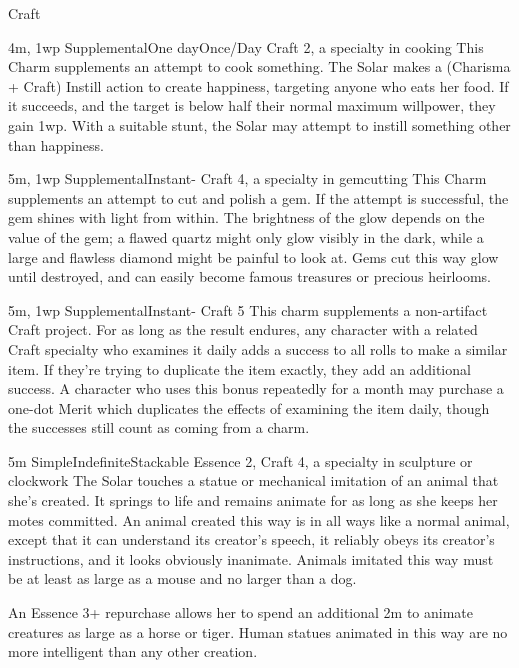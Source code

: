 \begin{Ability}{Craft}

  {4m, 1wp}
  {Supplemental}{One day}{Once/Day}
  {Craft 2, a specialty in cooking}
  This Charm supplements an attempt to cook something. The Solar makes a (Charisma + Craft) Instill action to create happiness, targeting anyone who eats her food. If it succeeds, and the target is below half their normal maximum willpower, they gain 1wp. With a suitable stunt, the Solar may attempt to instill something other than happiness.

  {5m, 1wp}
  {Supplemental}{Instant}{-}
  {Craft 4, a specialty in gemcutting}
  This Charm supplements an attempt to cut and polish a gem. If the attempt is successful, the gem shines with light from within. The brightness of the glow depends on the value of the gem; a flawed quartz might only glow visibly in the dark, while a large and flawless diamond might be painful to look at. Gems cut this way glow until destroyed, and can easily become famous treasures or precious heirlooms.

  {5m, 1wp}
  {Supplemental}{Instant}{-}
  {Craft 5}
  This charm supplements a non-artifact Craft project. For as long as the result endures, any character with a related Craft specialty who examines it daily adds a success to all rolls to make a similar item. If they're trying to duplicate the item exactly, they add an additional success. A character who uses this bonus repeatedly for a month may purchase a one-dot Merit which duplicates the effects of examining the item daily, though the successes still count as coming from a charm.

  {5m}
  {Simple}{Indefinite}{Stackable}
  {Essence 2, Craft 4, a specialty in sculpture or clockwork}
  The Solar touches a statue or mechanical imitation of an animal that she's created. It springs to life and remains animate for as long as she keeps her motes committed. An animal created this way is in all ways like a normal animal, except that it can understand its creator's speech, it reliably obeys its creator's instructions, and it looks obviously inanimate. Animals imitated this way must be at least as large as a mouse and no larger than a dog.

  An Essence 3+ repurchase allows her to spend an additional 2m to animate creatures as large as a horse or tiger. Human statues animated in this way are no more intelligent than any other creation.


\end{Ability}
